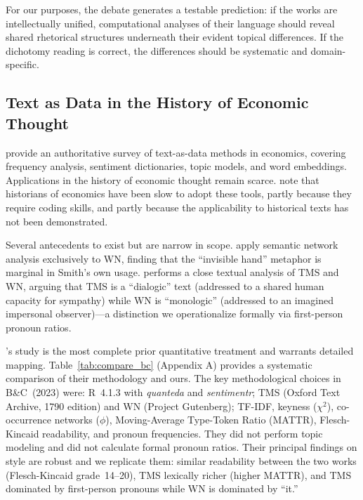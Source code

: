 \documentclass[12pt,a4paper]{article}
\begin{document}
For our purposes, the debate generates a testable prediction: if the
works are intellectually unified, computational analyses of their language
should reveal shared rhetorical structures underneath their evident
topical differences.
If the dichotomy reading is correct, the differences should be systematic
and domain-specific.

\subsection{Text as Data in the History of Economic Thought}

\citet{Gentzkow2019} provide an authoritative survey of text-as-data
methods in economics, covering frequency analysis, sentiment dictionaries,
topic models, and word embeddings.
Applications in the history of economic thought remain scarce.
\citet{Ballandonne2023} note that historians of economics have been slow
to adopt these tools, partly because they require coding skills, and
partly because the applicability to historical texts has not been
demonstrated.

Several antecedents to \citeauthor{Ballandonne2023} exist but are narrow
in scope.
\citet{GraaflandWells2021} apply semantic network analysis exclusively to
WN, finding that the ``invisible hand'' metaphor is marginal in Smith's
own usage.
\citet{Brown1994} performs a close textual analysis of TMS and WN,
arguing that TMS is a ``dialogic'' text (addressed to a shared human
capacity for sympathy) while WN is ``monologic'' (addressed to an
imagined impersonal observer)---a distinction we operationalize formally
via first-person pronoun ratios.

\citeauthor{Ballandonne2023}'s study is the most complete prior
quantitative treatment and warrants detailed mapping.
Table~\ref{tab:compare_bc} (Appendix A) provides a systematic comparison
of their methodology and ours.
The key methodological choices in B\&C~(2023) were: R~4.1.3 with
\textit{quanteda} and \textit{sentimentr}; TMS (Oxford Text Archive,
1790 edition) and WN (Project Gutenberg); TF-IDF, keyness
($\chi^2$), co-occurrence networks ($\phi$), Moving-Average
Type-Token Ratio (MATTR), Flesch-Kincaid readability, and pronoun
frequencies.
They did not perform topic modeling and did not calculate formal
pronoun ratios.
Their principal findings on style are robust and we replicate them:
similar readability between the two works (Flesch-Kincaid grade~14--20),
TMS lexically richer (higher MATTR), and TMS dominated by first-person
pronouns while WN is dominated by ``it.''
\end{document}
